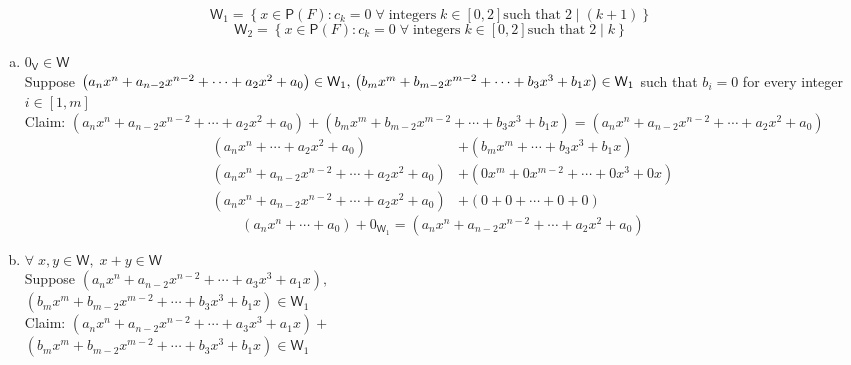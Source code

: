 \documentclass[letterpaper,12pt]{article}
\newcommand{\tab}{\hspace*{1.5em}}
\newcommand{\?}{\stackrel{?}{=}}
\begin{document}
\begin{spacing}{1.5}
\begin{enumerate}
\begin{equation}
\mathsf{W}_1 = \left\{x\in \mathsf{P}(F) \colon c_k = 0\; \forall\;
  \text{integers}\; k\in\left[0,2\right] \text{such that}\; 2\mid\left(k+1\right)\right\}
\end{equation}
\begin{equation}
\mathsf{W}_2 = \left\{x\in \mathsf{P}(F) \colon c_k = 0\; \forall\;
  \text{integers}\; k\in\left[0,2\right] \text{such that}\; 2\mid k\right\}
\end{equation}
\begin{enumerate}[(a)]
\item $0_\mathsf{V} \in \mathsf{W}$
\\
Suppose $\left(a_nx^n + a_{n-2}x^{n-2}+\cdots+ a_2x^2 + a_0\right) \in
\mathsf{W}_1,\\ \left(b_mx^m + b_{m-2}x^{m-2}+\cdots+ b_3x^3 + b_1x\right) \in
\mathsf{W}_1$ such that $b_i = 0$ for every integer
$i\in\left[1,m\right]$
\\
Claim: $\left(a_nx^n + a_{n-2}x^{n-2}+\cdots+ a_2x^2 + a_0\right) +
\left(b_mx^m + b_{m-2}x^{m-2}+\cdots+ b_3x^3 + b_1x\right) =
\left(a_nx^n + a_{n-2}x^{n-2}+\cdots+ a_2x^2 + a_0\right)$
\begin{align}
\left(a_nx^n +\cdots+ a_2x^2 + a_0\right) &+
\left(b_mx^m +\cdots+ b_3x^3 + b_1x\right)\\
\left(a_nx^n + a_{n-2}x^{n-2}+\cdots+ a_2x^2 + a_0\right) &+ \left(0x^m
  + 0x^{m-2}+\cdots+ 0x^3 + 0x\right)\\
\left(a_nx^n + a_{n-2}x^{n-2}+\cdots+ a_2x^2 + a_0\right) &+ \left(0
  + 0 +\cdots+ 0 + 0\right)
\end{align}
\begin{equation}
\left(a_nx^n +\cdots+ a_0\right) +
0_{\mathsf{W}_1} = \left(a_nx^n + a_{n-2}x^{n-2}+\cdots+ a_2x^2 + a_0\right)
\end{equation}
\newpage{}
\item $ \forall\; x,y \in \mathsf{W},\; x + y \in \mathsf{W}$
\\
Suppose $\left(a_nx^n + a_{n-2}x^{n-2}+\cdots+ a_3x^3 + a_1x\right),$ \\
\tab \tab \tab $\left(b_mx^m + b_{m-2}x^{m-2}+\cdots+ b_3x^3 + b_1x\right) \in
\mathsf{W}_1$
\\
Claim: $\left(a_nx^n + a_{n-2}x^{n-2}+\cdots+ a_3x^3 + a_1x\right) +$
\\ \tab \tab \tab $\left(b_mx^m + b_{m-2}x^{m-2}+\cdots+ b_3x^3 +
  b_1x\right) \in \mathsf{W}_1$

\end{enumerate}
\end{enumerate}
\end{spacing}
\end{document}
